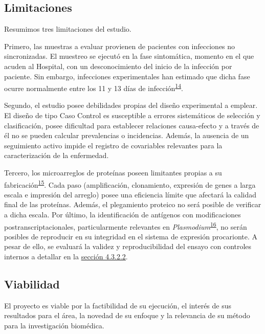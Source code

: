 \documentclass[]{article}
\begin{document}
\subsection{Limitaciones}\label{limit}

Resumimos tres limitaciones del estudio.

Primero, las muestras a evaluar provienen de pacientes con infecciones
no sincronizadas. El muestreo se ejecutó en la fase sintomática, momento
en el que acuden al Hospital, con un desconocimiento del inicio de la
infección por paciente. Sin embargo, infecciones experimentales han
estimado que dicha fase ocurre normalmente entre los 11 y 13 días de
infección\textsuperscript{\protect\hyperlink{ref-arevalo2014}{14}}.

Segundo, el estudio posee debilidades propias del diseño experimental a
emplear. El diseño de tipo Caso Control es susceptible a errores
sistemáticos de selección y clasificación, posee dificultad para
establecer relaciones causa-efecto y a través de él no se pueden
calcular prevalencias o incidencias. Además, la ausencia de un
seguimiento activo impide el registro de covariables relevantes para la
caracterización de la enfermedad.

Tercero, los microarreglos de proteínas poseen limitantes propias a su
fabricación\textsuperscript{\protect\hyperlink{ref-vigil2010}{15}}. Cada
paso (amplificación, clonamiento, expresión de genes a larga escala e
impresión del arreglo) posee una eficiencia límite que afectará la
calidad final de las proteínas. Además, el plegamiento proteico no será
posible de verificar a dicha escala. Por último, la identificación de
antígenos con modificaciones postranscriptacionales, particularmente
relevantes en
\emph{Plasmodium}\textsuperscript{\protect\hyperlink{ref-leroch2009postmod}{16}},
no serán posibles de reproducir en su integridad en el sistema de
expresión procarionte. A pesar de ello, se evaluará la validez y
reproducibilidad del ensayo con controles internos a detallar en la
\protect\hyperlink{validez}{sección 4.3.2.2}.

\subsection{Viabilidad}\label{viabilidad}

El proyecto es viable por la factibilidad de su ejecución, el interés de
sus resultados para el área, la novedad de su enfoque y la relevancia de
su método para la investigación biomédica.
\end{document}
